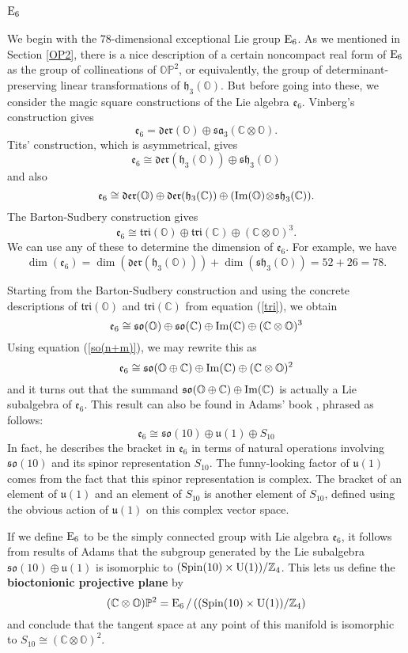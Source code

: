 \documentclass[12pt]{article}
\newcommand\Z{{\mathbb Z}}
\newcommand\C{{\mathbb C}}
\renewcommand\O{{\mathbb O}}
\newcommand\OP{{\mathbb {OP}}}
\renewcommand\P{{\mathbb P}}
\newcommand{\Spin}{{\rm Spin}}
\newcommand{\U}{{\rm U}}
\newcommand{\E}{{\rm E}}
\newcommand{\so}{{\mathfrak {so}}}
\renewcommand{\u}{{\mathfrak {u}}}
\newcommand{\e}{{\mathfrak {e}}}
\newcommand{\sa}{{\mathfrak {sa}}}
\newcommand{\h}{{\mathfrak {h}}}
\newcommand{\sh}{{\mathfrak {sh}}}
\newcommand{\Der}{{\mathfrak {der}}}
\newcommand{\Tri}{{\mathfrak {tri}}}
\renewcommand{\Im}{{\rm Im}}
\newcommand{\tensor}{\otimes}
\newcommand{\iso}{\cong}
\begin{document}
\subsection{$\E_6$}   \label{E6}   

We begin with the 78-dimensional exceptional Lie group $\E_6$.     
As we mentioned in Section \ref{OP2}, there is a nice description of a 
certain noncompact real form of $\E_6$ as the group of collineations
of $\OP^2$, or equivalently, the group of determinant-preserving 
linear transformations of $\h_3(\O)$.  But before going into these,
we consider the magic square constructions of the Lie algebra $\e_6$.
Vinberg's construction gives 
\[
\e_6 = \Der(\O) \oplus \sa_3(\C \tensor \O)  .
\label{e6.1}
\]
Tits' construction, which is asymmetrical, gives
\[
\e_6 \iso \Der(\h_3(\O)) \oplus \sh_3(\O)  
\label{e6.2}
\]
and also
\[
\e_6 \iso \Der(\O) \oplus \Der(\h_3(\C)) \oplus    
(\Im(\O) \!\tensor \! \sh_3(\C))  .
\label{e6.3}
\]
The Barton-Sudbery construction gives
\[
\e_6 \iso \Tri(\O) \oplus \Tri(\C) \oplus (\C \tensor \O)^3 .
\label{e6.4}
\]
We can use any of these to determine the dimension of $\e_6$.   For
example, we have 
\[ \dim(\e_6) = \dim(\Der(\h_3(\O))) + \dim(\sh_3(\O)) = 52 + 26 = 78. \]

Starting from the Barton-Sudbery construction and using the concrete
descriptions of $\Tri(\O)$ and $\Tri(\C)$ from equation
(\ref{tri}), we obtain
\[
\e_6 \iso \so(\O) \oplus \so(\C) \oplus \Im(\C) \oplus (\C \tensor \O)^3 
\label{e6.5}
\]
Using equation (\ref{so(n+m)}), we may rewrite this as
\[
\e_6 \iso \so(\O \oplus \C) \oplus \Im(\C) \oplus (\C \tensor \O)^2
\label{e6.6}
\]
and it turns out that the summand $\so(\O \oplus \C) \oplus \Im(\C)$ is 
actually a Lie subalgebra of $\e_6$.  This result can also be found in 
Adams' book \cite{Adams}, phrased as follows: 
\[
\e_6 \iso \so(10) \oplus \u(1) \oplus S_{10}
\label{e6.7}
\]
In fact, he describes the bracket in $\e_6$ in terms of natural
operations involving $\so(10)$ and its spinor representation $S_{10}$. 
The funny-looking factor of $\u(1)$ comes from the fact that this spinor
representation is complex.  The bracket of an element of $\u(1)$ and
an element of $S_{10}$ is another element of $S_{10}$, defined using
the obvious action of $\u(1)$ on this complex vector space.  

If we define $\E_6$ to be the simply connected group with Lie algebra
$\e_6$, it follows from results of Adams that the subgroup generated by
the Lie subalgebra $\so(10) \oplus \u(1)$ is isomorphic to  $(\Spin(10)
\times \U(1))/\Z_4$.  This lets us define the {\bf bioctonionic
projective plane} by
\[     (\C \tensor \O)\P^2 = \E_6\, / \, ((\Spin(10) \times \U(1))/\Z_4) \]
and conclude that the tangent space at any point of this manifold is
isomorphic to $S_{10} \iso (\C \tensor \O)^2$.  
\end{document}
